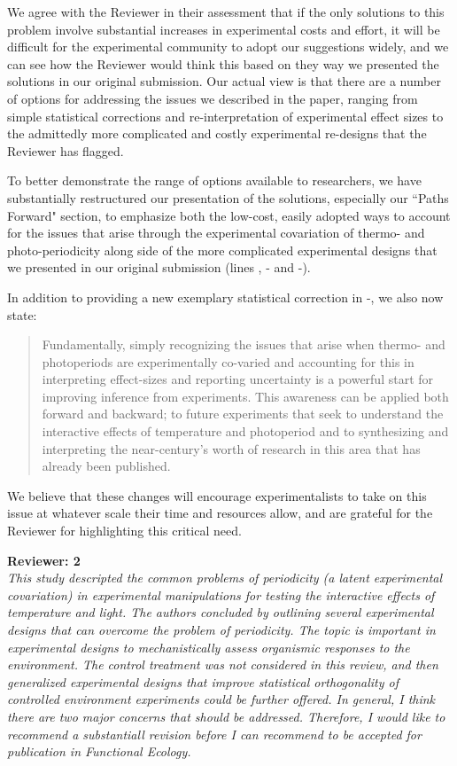 \documentclass[11pt]{article}
\begin{document}
 We agree with the Reviewer in their assessment that if the only solutions to this problem involve substantial increases in experimental costs and effort, it will be difficult for the experimental community to adopt our suggestions widely, and we can see how the Reviewer would think this based on they way we presented the solutions in our original submission. Our actual view is that there are a number of options for addressing the issues we described in the paper, ranging from simple statistical corrections and re-interpretation of experimental effect sizes to the admittedly more complicated and costly experimental re-designs that the Reviewer has flagged.
 
To better demonstrate the range of options available to researchers, we have substantially restructured our presentation of the solutions, especially our ``Paths Forward" section, to emphasize both the low-cost, easily adopted ways to account for the issues that arise through the experimental covariation of thermo- and photo-periodicity along side of the more complicated experimental designs that we presented in our original submission (lines , - and -). 

In addition to providing a new exemplary statistical correction in -, we also now state:
\begin{quote}Fundamentally, simply recognizing the issues that arise when thermo- and photoperiods are experimentally co-varied and accounting for this in interpreting effect-sizes and reporting uncertainty is a powerful start for improving inference from experiments. This awareness can be applied both forward and backward; to future experiments that seek to understand the interactive effects of temperature and photoperiod and to synthesizing and interpreting the near-century's worth of research in this area that has already been published.\end{quote}
We believe that these changes will encourage experimentalists to take on this issue at whatever scale their time and resources allow, and are grateful for the Reviewer for highlighting this critical need.

\textbf{Reviewer: 2}\\
\emph{This study descripted the common problems of periodicity (a latent experimental covariation) in experimental manipulations for testing the interactive effects of temperature and light. The authors concluded by outlining several experimental designs that can overcome the problem of periodicity. The topic is important in experimental designs to mechanistically assess organismic responses to the environment. The control treatment was not considered in this review, and then generalized experimental designs that improve statistical orthogonality of controlled environment experiments could be further offered. In general, I think there are two major concerns that should be addressed. Therefore, I would like to recommend a substantiall revision before I can recommend to be accepted for publication in Functional Ecology.}
\end{document}
